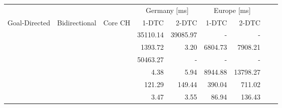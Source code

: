 \begin{tabular}{cccrrrrrr}
	\toprule
	              &               &         & \multicolumn{2}{c}{Germany [\si{\milli\second}]} & \multicolumn{2}{c}{Europe [\si{\milli\second}]}                 \\
	Goal-Directed & Bidirectional & Core CH & 1-DTC                                            & 2-DTC                                           & 1-DTC & 2-DTC \\
	\midrule
	\xmark        & \xmark        & \xmark  & 35110.14                                                & 39085.97                                               & -     & -     \\
	\cmark        & \xmark        & \xmark  & 1393.72                                                & 3.20                                               & 6804.73     & 7908.21     \\
	\xmark        & \cmark        & \xmark  & 50463.27                                                & -                                               & -     & -     \\
	\cmark        & \cmark        & \xmark  & 4.38                                                & 5.94                                               & 8944.88     & 13798.27     \\
	\xmark        & \cmark        & \cmark  & 121.29                                                & 149.44                                               & 390.04     & 711.02     \\
	\cmark        & \cmark        & \cmark  & 3.47                                                & 3.55                                               & 86.94     & 136.43     \\
	\bottomrule
\end{tabular}